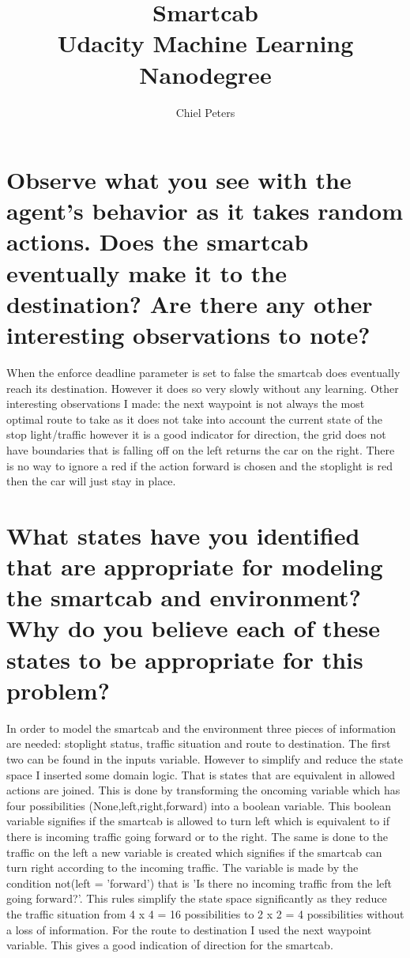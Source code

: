 \documentclass{article}
\begin{document}
\title{Smartcab \\ Udacity Machine Learning Nanodegree}
\author{Chiel Peters}
\maketitle

\section*{Observe what you see with the agent's behavior as it takes random actions. Does the smartcab eventually make it to the destination? Are there any other interesting observations to note?}

When the enforce deadline parameter is set to false the smartcab does eventually reach its destination. However it does so very slowly without any learning. Other interesting observations I made: the next waypoint is not always the most optimal route to take as it does not take into account the current state of the stop light/traffic however it is a good indicator for direction, the grid does not have boundaries that is falling off on the left returns the car on the right. There is no way to ignore a red if the action forward is chosen and the stoplight is red then the car will just stay in place.

\section*{What states have you identified that are appropriate for modeling the smartcab and environment? Why do you believe each of these states to be appropriate for this problem?}

In order to model the smartcab and the environment three pieces of information are needed: stoplight status, traffic situation and route to destination. The first two can be found in the inputs variable. However to simplify and reduce the state space I inserted some domain logic. That is states that are equivalent in allowed actions are joined. This is done by transforming the oncoming variable which has four possibilities (None,left,right,forward) into a boolean variable. This boolean variable signifies if the smartcab is allowed to turn left which is equivalent to if there is incoming traffic going forward or to the right. The same is done to the traffic on the left a new variable is created which signifies if the smartcab can turn right according to the incoming traffic. The variable is made by the condition not(left = 'forward') that is 'Is there no incoming traffic from the left going forward?'. This rules simplify the state space significantly as they reduce the traffic situation from 4 x 4 = 16 possibilities to 2 x 2 = 4 possibilities without a loss of information. For the route to destination I used the next waypoint variable. This gives a good indication of direction for the smartcab.
\end{document}

